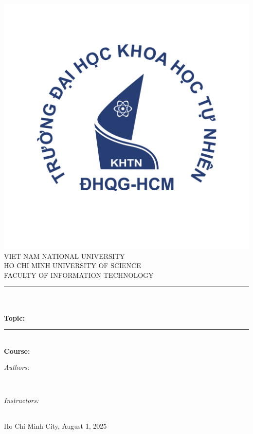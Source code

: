 \begin{titlepage}
    \newcommand{\HRule}{\rule{\linewidth}{0.3mm}}
    \centering
\includegraphics[scale=.30]{img/hcmus-logo.png}\\
\textsc{\LARGE VIET NAM NATIONAL UNIVERSITY}\\[0.4cm]
\textsc{\Large HO CHI MINH UNIVERSITY OF SCIENCE}\\[0.5cm]
\textsc{\large FACULTY OF INFORMATION TECHNOLOGY}\\[0.5cm]

\HRule \\[0.1cm]
{ 
\huge{\bfseries{\reporttitle}}\\[0.5cm]
\large{\bfseries{Topic: \reportname}}
}\\[0.4cm]
\HRule \\[0.5cm]

\textbf{\large Course: \coursename}\\[0.5cm]

\begin{minipage}[t]{0.5\textwidth}
\begin{flushleft} \large
\emph{Authors:}\\
\studentname
\end{flushleft}
\end{minipage}
~
\begin{minipage}[t]{0.4\textwidth}
\begin{flushright} \large
\emph{Instructors:} \\
\teachername
\end{flushright}
\end{minipage}\\[1cm]

{\large Ho Chi Minh City, August 1, 2025}\\[1cm]


\vfill
\end{titlepage}
	